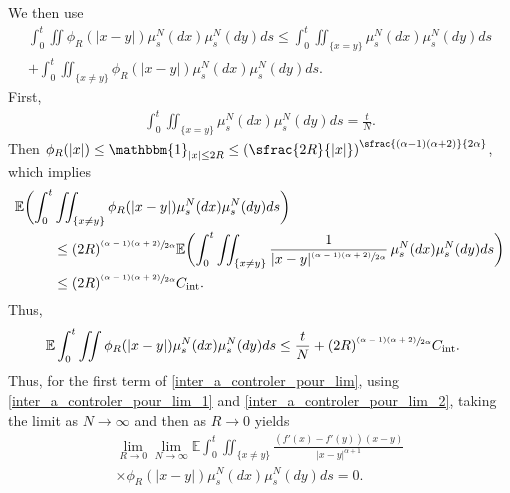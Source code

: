 \documentclass[JEP,XML,SOM,Unicode,published]{cedram}
\let\mathds\mathbbm
\newcommand{\rint}{\mathrm{int}}
\theoremstyle{plain}
\theoremstyle{definition}
\begin{document}
We then use
\begin{multline*}
\int_{0}^t\iint\phi_R(|x-y|)\mu^N_s(dx)\mu^N_s(dy)ds
\leq \int_{0}^t\iint_{\{x=y\}}\mu^N_s(dx)\mu^N_s(dy)ds\\
+\int_{0}^t\iint_{\{x\neq y\}}\phi_R(|x-y|)\mu^N_s(dx)\mu^N_s(dy)ds.
\end{multline*}
First,
\begin{align*}
\int_{0}^t\iint_{\{x=y\}}\mu^N_s(dx)\mu^N_s(dy)ds=\frac{t}{N}.
\end{align*}
Then $\phi_R(|x|)\leq \mathds{1}_{|x|\leq2R}\leq\left(\sfrac{2R}{|x|}\right)^{\sfrac{(\alpha-1)(\alpha+2)}{2\alpha}}$,
which implies
\begin{align*}
\mathbb{E}\biggl(\int_{0}^t&\iint_{\{x\neq y\}}\phi_R(|x-y|)\mu^N_s(dx)\mu^N_s(dy)ds\biggr)\\
&\leq(2R)^{\sfrac{(\alpha-1)(\alpha+2)}{2\alpha}}\mathbb{E}\biggl(\int_{0}^t\iint_{\{x\neq y\}}\frac{1}{|x-y|^{\sfrac{(\alpha-1)(\alpha+2)}{2\alpha}}}\,\mu^N_s(dx)\mu^N_s(dy)ds\biggr)\\
&\leq (2R)^{\sfrac{(\alpha-1)(\alpha+2)}{2\alpha}}C_{\rint}.
\end{align*}
Thus,
\begin{align}
\mathbb{E}\int_{0}^t\iint\phi_R(|x-y|)\mu^N_s(dx)\mu^N_s(dy)ds&\leq \frac{t}{N}+(2R)^{\sfrac{(\alpha-1)(\alpha+2)}{2\alpha}}C_{\rint}\label{inter_a_controler_pour_lim_2}.
\end{align}
Thus, for the first term of \eqref{inter_a_controler_pour_lim}, using \eqref{inter_a_controler_pour_lim_1} and \eqref{inter_a_controler_pour_lim_2}, taking the limit as $N\to\infty$ and then as $R\to0$ yields
\begin{multline}\label{I_4_terme1}
\lim_{R\to0}\lim_{N\to\infty}
\mathbb{E}\int_{0}^t\iint_{\{x\neq y\}}\frac{(f'(x)-f'(y))(x-y)}{|x-y|^{\alpha+1}}\\
\times\phi_R(|x-y|)\mu^N_s(dx)\mu^N_s(dy)ds=0.
\end{multline}
\end{document}
